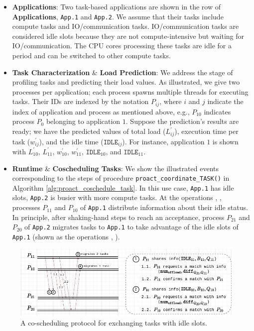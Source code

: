 \begin{itemize}
	\item \textbf{Applications}: Two task-based applications are shown in the row of \textbf{Applications}, \texttt{App.1} and \texttt{App.2}. We assume that their tasks include compute tasks and IO/communication tasks. IO/communication tasks are considered idle slots because they are not compute-intensive but waiting for IO/communication. The CPU cores processing these tasks are idle for a period and can be switched to other compute tasks.
	\item \textbf{Task Characterization} \& \textbf{Load Prediction}: We address the stage of profiling tasks and predicting their load values. As illustrated, we give two processes per application; each process spawns multiple threads for executing tasks. Their IDs are indexed by the notation $P_{ij}$, where $i$ and $j$ indicate the index of application and process as mentioned above, e.g., $P_{10}$ indicates process $P_{0}$ belonging to application $1$. Suppose the prediction's results are ready; we have the predicted values of total load ($L^{'}_{ij}$), execution time per task ($w^{'}_{ij}$), and the idle time ($\texttt{IDLE}_{ij}$). For instance, application $1$ is shown with $L^{'}_{10}$, $L^{'}_{11}$, $w^{'}_{10}$, $w^{'}_{11}$, $\texttt{IDLE}_{10}$, and $\texttt{IDLE}_{11}$.
	\item \textbf{Runtime} \& \textbf{Coscheduling Tasks}: We show the illustrated events corresponding to the steps of procedure \texttt{proact\_coordinate\_TASK()} in Algorithm \ref{alg:proact_coschedule_task}. In this use case, \texttt{App.1} has idle slots, \texttt{App.2} is busier with more compute tasks. At the operations , , processes $P_{11}$ and $P_{10}$ of \texttt{App.1} distribute information about their idle status. In principle, after shaking-hand steps to reach an acceptance, process $P_{21}$ and $P_{20}$ of \texttt{App.2} migrates tasks to \texttt{App.1} to take advantage of the idle slots of \texttt{App.1} (shown as the operations , ).
\end{itemize}

\begin{figure}[t]
	\centering
	\includegraphics[scale=0.95]{./pictures/padlb_approach/padlb_coscheduling_protocol.pdf}
	\caption{A co-scheduling protocol for exchanging tasks with idle slots.}
	\label{fig:proact_coschedule_protocol}
\end{figure}


